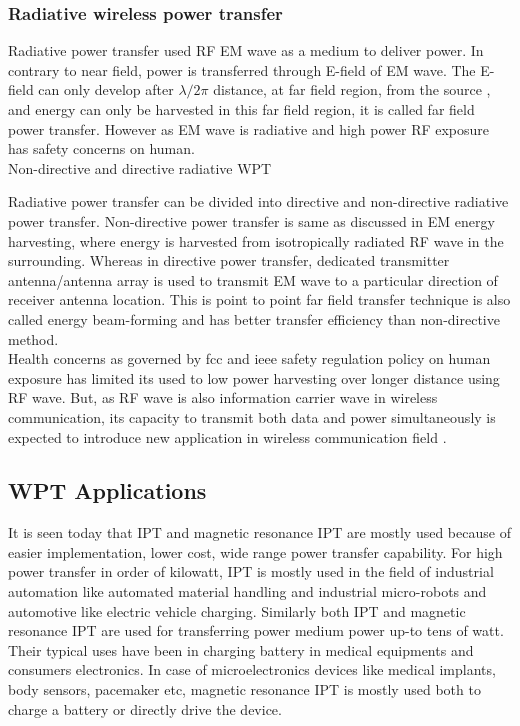 \documentclass[12pt,a4paper,UKenglish]{article}
\begin{document}
\subsubsection{Radiative wireless power transfer}

Radiative power transfer used RF EM wave as a medium to deliver power. In contrary to near field, power is 
transferred through E-field of EM wave. The E-field can only develop after $\lambda /2\pi$ distance, at far 
field region, from the source \cite[pp. 112]{rfid_2010}, and energy can only be harvested in this far field 
region, it is called far field power transfer. However as EM wave is radiative and high power RF exposure has 
safety concerns on human. \\

Non-directive and directive radiative WPT

Radiative power transfer can be divided into directive and non-directive radiative power transfer. Non-directive 
power transfer is same as discussed in EM energy harvesting, where energy is harvested from isotropically 
radiated RF wave in the surrounding.   Whereas in directive power transfer, dedicated transmitter antenna/antenna 
array is used to transmit EM wave to a particular direction of receiver antenna location. This is point to point 
far field transfer technique is also called energy beam-forming and has better transfer efficiency than 
non-directive method. \\

Health concerns as governed by \acrshort{fcc} and \acrshort{ieee} safety regulation policy on human exposure has 
limited its used to low power harvesting over longer distance using RF wave. But, as RF wave is also information 
carrier wave in wireless communication, its capacity to transmit both data and power simultaneously is expected 
to introduce new application in wireless communication field  \cite{wpt_fund_std}. \\

\subsection{WPT Applications}

It is seen today that IPT and magnetic resonance IPT are mostly used because of easier implementation, lower 
cost, wide range power transfer capability. For high power transfer in order of kilowatt, IPT is mostly used 
in the field of industrial automation like automated material handling and industrial micro-robots  and 
automotive like electric vehicle charging.  Similarly both IPT and magnetic resonance IPT are used for 
transferring power medium power up-to tens of watt. Their typical uses have been in charging battery in 
medical equipments and consumers electronics. In case of microelectronics devices like medical implants, body 
sensors, pacemaker etc, magnetic resonance IPT is mostly used both to charge a battery or directly drive the 
device. \\
\end{document}
